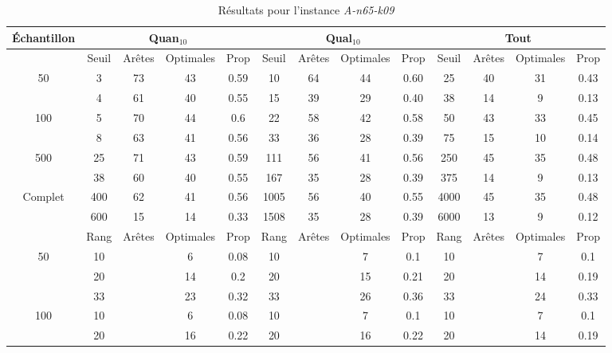 \documentclass[a4paper,11pt]{article}%
\begin{document}
\begin{table}[h]
\begin{center}
\begin{tabular}{|@{}c@{}|@{}c@{}|@{}c@{}|@{}c@{}|@{}c@{}||@{}c@{}|@{}c@{}|@{}c@{}|@{}c@{}||@{}c@{}|@{}c@{}|@{}c@{}|@{}c@{}|}
\end{tabular}
\end{center}
\end{table}


\begin{table}[h]
\caption{Résultats pour l'instance \emph{A-n65-k09}}
\label{T2}
\begin{center}
\begin{tabular}{|@{}c@{}|@{}c@{}|@{}c@{}|@{}c@{}|@{}c@{}||@{}c@{}|@{}c@{}|@{}c@{}|@{}c@{}||@{}c@{}|@{}c@{}|@{}c@{}|@{}c@{}|}

\hline
 Échantillon & \multicolumn{4}{c|}{Quan$_{10}$} & \multicolumn{4}{c|}{Qual$_{10}$} & \multicolumn{4}{c|}{Tout} \\
 \hline
 & Seuil & Arêtes & Optimales & Prop & Seuil & Arêtes & Optimales & Prop & Seuil & Arêtes & Optimales & Prop \\
 \hline
 50 & 3 & 73 & 43 & 0.59 & 10 & 64 & 44 & 0.60 & 25 & 40 & 31 & 0.43 \\
 \cline{2-13} 
    & 4 & 61 & 40 & 0.55 & 15 & 39 & 29 & 0.40 & 38 & 14 & 9 & 0.13 \\
  \hline
   100 & 5 & 70 & 44 & 0.6 & 22 & 58 & 42 & 0.58 & 50 & 43 & 33 & 0.45 \\
 \cline{2-13} 
    & 8 & 63 & 41 & 0.56 & 33 & 36 & 28 & 0.39 & 75 & 15 & 10 & 0.14 \\
  \hline
   500 & 25 & 71 & 43 & 0.59 & 111 & 56 & 41 & 0.56 & 250 & 45 & 35 & 0.48 \\
 \cline{2-13} 
    & 38 & 60 & 40 & 0.55 & 167 & 35 & 28 & 0.39 & 375 & 14 & 9 & 0.13 \\
  \hline
   Complet & 400 & 62 & 41 & 0.56 & 1005 & 56 & 40 & 0.55 & 4000 & 45 & 35 & 0.48 \\
 \cline{2-13} 
    & 600 & 15 & 14 & 0.33 & 1508 & 35 & 28 & 0.39 & 6000 & 13 & 9 & 0.12 \\
  \hline
 & Rang& Arêtes & Optimales & Prop & Rang& Arêtes & Optimales & Prop & Rang& Arêtes & Optimales & Prop \\
 \hline
 50 & 10 & & 6 & 0.08 & 10&  & 7 & 0.1 & 10&  & 7 & 0.1  \\
 \cline{2-13} 
    & 20& & 14 & 0.2 & 20&  & 15 & 0.21 & 20&  & 14 & 0.19  \\
 \cline{2-13} 
    & 33& & 23 & 0.32 & 33& & 26 & 0.36 & 33& & 24 & 0.33  \\
  \hline
   100 & 10&  & 6 & 0.08 & 10&  & 7 & 0.1 & 10&  & 7 & 0.1  \\
 \cline{2-13} 
    & 20& & 16 & 0.22 & 20& & 16 & 0.22 & 20& & 14 & 0.19  \\

\end{tabular}
\end{center}
\end{table}
\end{document}
